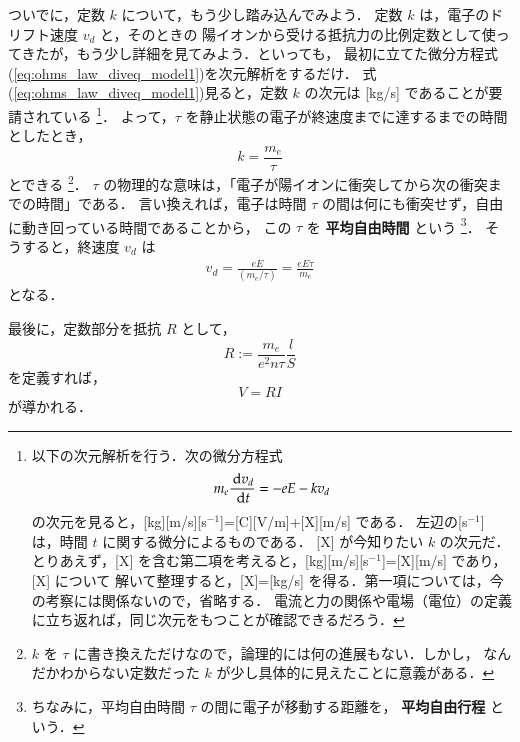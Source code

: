             ついでに，定数 $k$ について，もう少し踏み込んでみよう．
            定数 $k$ は，電子のドリフト速度 $v_{d}$ と，そのときの
            陽イオンから受ける抵抗力の比例定数として使ってきたが，もう少し詳細を見てみよう．といっても，
            最初に立てた微分方程式(\ref{eq:ohms_law_diveq_model1})を次元解析をするだけ．
            式(\ref{eq:ohms_law_diveq_model1})見ると，定数 $k$ の次元は [kg/s] であることが要請されている
            \footnote{
                以下の次元解析を行う．次の微分方程式
                \begin{equation*}
                    m_{e}\frac{\,\mathrm{d} v_{d}}{\,\mathrm{d} t}=-eE-kv_{d}
                \end{equation*}
                の次元を見ると，[kg][m/s][s${}^{-1}$]=[C][V/m]+[X][m/s] である．
                左辺の[s${}^{-1}$] は，時間 $t$ に関する微分によるものである．
                [X] が今知りたい $k$ の次元だ．
                とりあえず，[X] を含む第二項を考えると，[kg][m/s][s${}^{-1}$]=[X][m/s] であり，[X] について
                解いて整理すると，[X]=[kg/s] を得る．第一項については，今の考察には関係ないので，省略する．
                電流と力の関係や電場（電位）の定義に立ち返れば，同じ次元をもつことが確認できるだろう．
            }．
            よって，$\tau$ を静止状態の電子が終速度までに達するまでの時間としたとき，
            \begin{equation*}
                k=\frac{m_{e}}{\tau}
            \end{equation*}
            とできる
            \footnote{
                $k$ を $\tau$ に書き換えただけなので，論理的には何の進展もない．しかし，
                なんだかわからない定数だった $k$ が少し具体的に見えたことに意義がある．
            }．
            $\tau$ の物理的な意味は，「電子が陽イオンに衝突してから次の衝突までの時間」である．
            言い換えれば，電子は時間 $\tau$ の間は何にも衝突せず，自由に動き回っている時間であることから，
            この $\tau$ を \textbf{平均自由時間} という
            \footnote{
                ちなみに，平均自由時間 $\tau$ の間に電子が移動する距離を，
                \textbf{平均自由行程} という．
            }．
            そうすると，終速度 $v_{d}$ は
                \begin{align}
                    v_{d}= \frac{eE}{(m_{e}/\tau)}=\frac{eE\tau}{m_{e}}
                \end{align}
            となる．

            最後に，定数部分を抵抗 $R$ として，
                \begin{equation*}
                    R := \frac{m_{e}}{e^{2}n\tau}\frac{l}{S}
                \end{equation*}
            を定義すれば，
                \begin{equation*}
                    V=RI
                \end{equation*}
            が導かれる．

